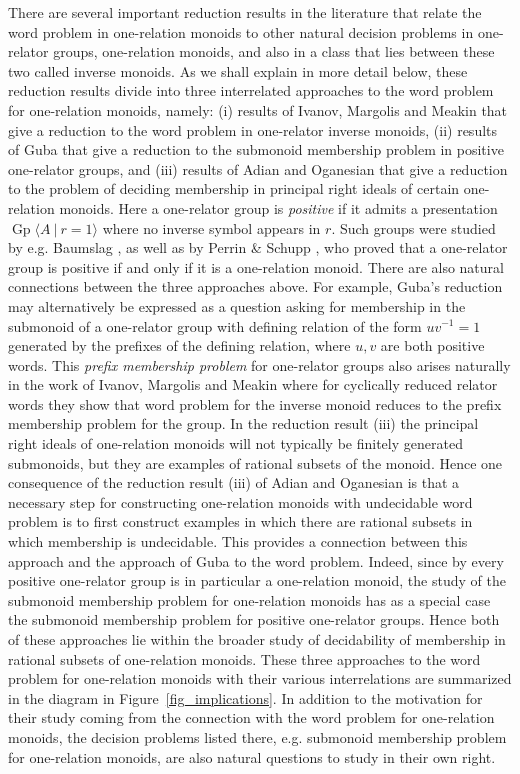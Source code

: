 \documentclass{amsart}
\newcommand{\Gpres}[2]{\operatorname{Gp}\bigl\langle #1\:|\:#2 \bigr\rangle}
\theoremstyle{plain}
\theoremstyle{definition}
\begin{document}
There are several important reduction results in the literature that relate the word problem in one-relation monoids to other natural decision problems in one-relator groups, one-relation monoids, and also in a class that lies between these two called inverse monoids. As we shall explain in more detail below, these reduction results divide into three interrelated approaches to the word problem for one-relation monoids, namely:  
(i) results of Ivanov, Margolis and Meakin \cite{Ivanov2001} that give a reduction to the word problem in one-relator inverse monoids, 
(ii) results of Guba \cite{Guba1997} that give a reduction 
to the submonoid membership problem in positive one-relator groups, 
and 
(iii) results of Adian and Oganesian 
\cite{Adian1966, Adian1976, Adian1987}
that give a reduction to the problem of deciding membership in principal right ideals of certain one-relation monoids.   
Here a one-relator group is \textit{positive} if it admits a presentation $\Gpres{A}{r=1}$ where no inverse symbol appears in $r$. Such groups were studied by e.g. Baumslag \cite{Baumslag1971}, as well as by Perrin \& Schupp \cite{Perrin1984}, who proved that a one-relator group is positive if and only if it is a one-relation monoid. 
There are also natural connections between the three approaches above. 
For example, Guba's reduction may alternatively be expressed as a question asking for membership in the submonoid of a one-relator group with defining relation of the form $uv^{-1}=1$ generated by the prefixes of the defining relation, where $u, v$ are both positive words. This \emph{prefix membership problem} for one-relator groups also arises naturally in the work of  
Ivanov, Margolis and Meakin \cite{Ivanov2001} where for cyclically reduced relator words they show that word problem for the inverse monoid reduces to the prefix membership problem for the group. 
In the reduction result (iii) the principal right ideals of one-relation monoids will not typically be finitely generated submonoids, but they are examples of rational subsets of the monoid. Hence one consequence of the reduction result (iii) of Adian and Oganesian is that a necessary step for constructing one-relation monoids with undecidable word problem is to first construct examples in which there are rational subsets in which membership is undecidable. 
This provides a connection between this approach and the approach of Guba to the word problem. 
Indeed, since by \cite{Perrin1984} every positive one-relator group is in particular a one-relation monoid,
the study of the submonoid membership problem for one-relation monoids has as a special case the submonoid membership problem for positive one-relator groups. 
Hence both of these approaches lie within the broader study of decidability of membership in rational subsets of one-relation monoids.  
These three approaches to the word problem for one-relation monoids with their various interrelations are summarized in the diagram in Figure~\ref{fig_implications}.
In addition to the motivation for their study coming from the connection with the word problem for one-relation monoids, the decision problems listed there, e.g. submonoid membership problem for one-relation monoids, are also natural questions to study in their own right.  
\end{document}
